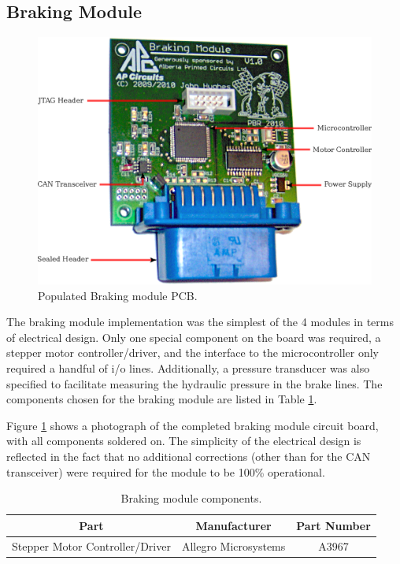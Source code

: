\subsection{Braking Module}

\begin{figure}[h]
\centering
\includegraphics[scale=1]{implementation/figures/braking_pcb}
\caption{Populated Braking module PCB.}
\label{fig:braking_pcb}
\end{figure}

The braking module implementation was the simplest of the 4 modules in terms of electrical design. Only one special component on the board was required, a stepper motor controller/driver, and the interface to the microcontroller only required a handful of i/o lines. Additionally, a pressure transducer was also specified to facilitate measuring the hydraulic pressure in the brake lines. The components chosen for the braking module are listed in Table \ref{table:braking_module_components}.

Figure \ref{fig:braking_pcb} shows a photograph of the completed braking module circuit board, with all components soldered on. The simplicity of the electrical design is reflected in the fact that no additional corrections (other than for the CAN transceiver) were required for the module to be 100\% operational.

\begin{table}
  \caption{Braking module components.\label{table:braking_module_components}}
  \centering
  \begin{tabular}{|c|c|c|}
    \hline 
    Part & Manufacturer & Part Number\tabularnewline 
    \hline \hline
    Stepper Motor Controller/Driver & Allegro Microsystems & A3967 \tabularnewline
    \hline
  \end{tabular}
\end{table}

